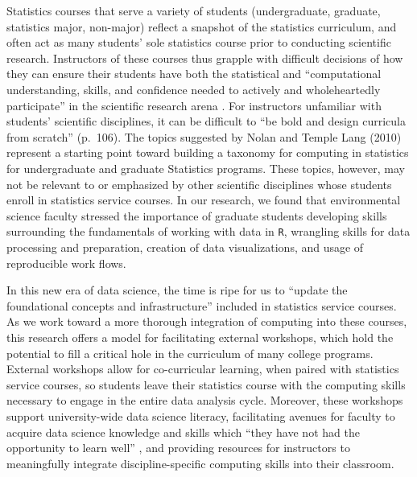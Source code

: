 \documentclass[12pt]{article}
\begin{document}
\quad Statistics courses that serve a variety of students (undergraduate,
graduate, statistics major, non-major) reflect a snapshot of the statistics
curriculum, and often act as many students' sole statistics course prior to
conducting scientific research. Instructors of these courses thus grapple with 
difficult decisions of how they can ensure their students have both the
statistical and ``computational understanding, skills, and confidence needed to
actively and wholeheartedly participate'' in the scientific research arena 
\citep[p.\ 106]{nolan}. For instructors unfamiliar with students' scientific
disciplines, it can be difficult to ``be bold and design curricula from
scratch'' (p.\ 106). The topics suggested by Nolan and Temple Lang
(2010) represent a starting point toward building a taxonomy for computing in
statistics for undergraduate and graduate Statistics programs. These topics,
however, may not be relevant to or emphasized by other scientific disciplines
whose students enroll in statistics service courses.  In our
research, we found that environmental science faculty stressed the importance of
graduate students developing skills surrounding the fundamentals of working with
data in \texttt{R}, wrangling skills for data processing and preparation, 
creation of data visualizations, and usage of reproducible work flows. 

\quad In this new era of data science, the time is ripe for us to ``update the foundational concepts and
infrastructure'' \citep[p.\ 5]{crossroads} included in statistics service
courses. As we work toward a more thorough
integration of computing into these courses, this research offers a model for
facilitating external workshops, which hold the potential to fill a critical
hole in the curriculum of many college programs. External workshops allow for 
co-curricular learning, when paired with statistics service courses, so students
leave their statistics course with the computing skills necessary to engage in
the entire data analysis cycle. Moreover, these workshops support
university-wide data science literacy, facilitating avenues for faculty to
acquire data science knowledge and skills which ``they have not had the
opportunity to learn well'' \citep[p.\ 106]{nolan}, and providing resources for
instructors to meaningfully integrate discipline-specific computing skills into
their classroom. 

\end{document}
